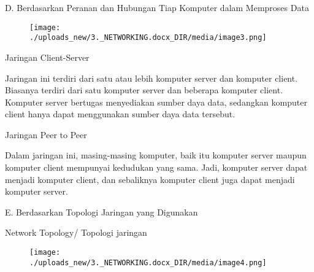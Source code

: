 \documentclass{wileySix}
\begin{document}
\vspace{12pt}
\noindent 
D. Berdasarkan Peranan dan Hubungan Tiap Komputer dalam Memproses Data \par
\noindent 
\begin{center}
	
	
	
	\begin{figure}[H]
		\begin{center}
			\texttt{[image: ./uploads\_new/3.\_NETWORKING.docx\_DIR/media/image3.png]}
		\end{center}
	\end{figure}
	
	
	
	
\end{center}\vspace{12pt}
\noindent 
\begin{myEnumerate}
	\item Jaringan Client-Server \par
	Jaringan ini terdiri dari satu atau lebih komputer server dan komputer client. Biasanya terdiri dari satu komputer server dan beberapa komputer client. Komputer server bertugas menyediakan sumber daya data, sedangkan komputer client hanya dapat menggunakan sumber daya data tersebut. \par
	\vspace{12pt}
	\noindent 
	\item Jaringan Peer to Peer\end{myEnumerate}
\par
Dalam jaringan ini, masing-masing komputer, baik itu komputer server maupun komputer client mempunyai kedudukan yang sama. Jadi, komputer server dapat menjadi komputer client, dan sebaliknya komputer client juga dapat menjadi komputer server. \par
\vspace{12pt}
\noindent 
E. Berdasarkan Topologi Jaringan yang Digunakan \par
\noindent 
Network Topology/ Topologi jaringan \par
\noindent 
\begin{center}
	
	
	
	\begin{figure}[H]
		\begin{center}
			\texttt{[image: ./uploads\_new/3.\_NETWORKING.docx\_DIR/media/image4.png]}
		\end{center}
	\end{figure}
	
	
	
	
\end{center}\vspace{12pt}
\end{document}
